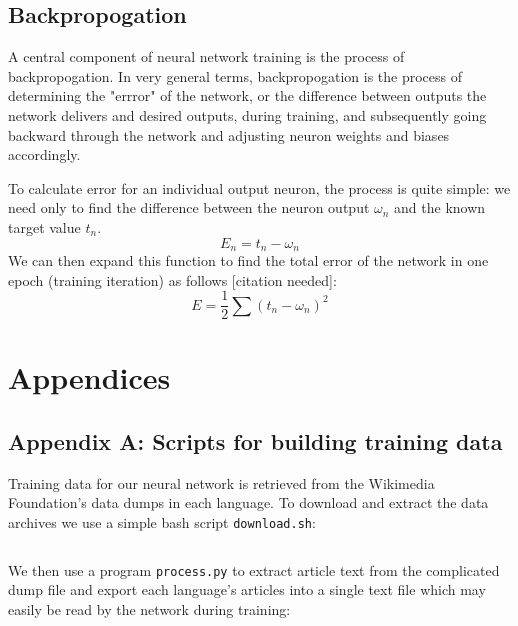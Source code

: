 \documentclass{article}
\begin{document}
\subsection{Backpropogation}
A central component of neural network training is the process of backpropogation. In very general terms, backpropogation is the process of determining the "errror" of the network, or the difference between outputs the network delivers and desired outputs, during training, and subsequently going backward through the network and adjusting neuron weights and biases accordingly.

To calculate error for an individual output neuron, the process is quite simple: we need only to find the difference between the neuron output $\omega_n$ and the known target value $t_n$.
$$E_n=t_n-\omega_n$$
We can then expand this function to find the total error of the network in one epoch (training iteration) as follows [citation needed]:
$$E=\frac{1}{2}\sum(t_n-\omega_n)^2$$

\section{Appendices}

\label{sec:appendix_a}
\subsection{Appendix A: Scripts for building training data}
Training data for our neural network is retrieved from the Wikimedia Foundation's data dumps in each language. To download and extract the data archives we use a simple bash script \texttt{download.sh}:
\inputminted{bash}{data/download.sh}
We then use a program \texttt{process.py} to extract article text from the complicated dump file and export each language's articles into a single text file which may easily be read by the network during training:
\inputminted{python}{data/process.py}


\end{document}
